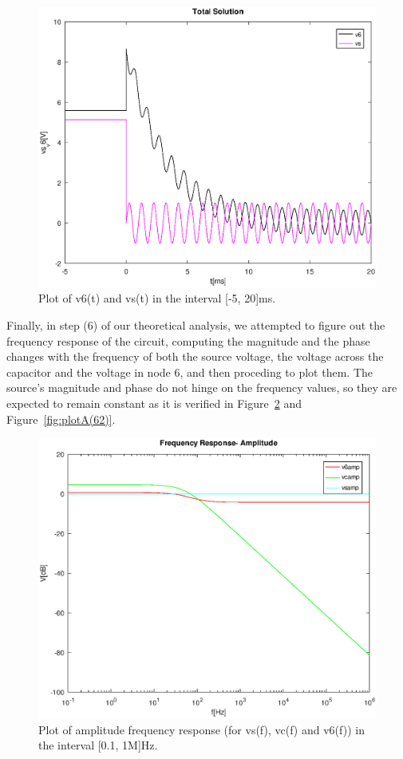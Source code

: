 \begin{figure}[h] \centering
\includegraphics[width=0.8\linewidth]{TotalSolution.eps}
\caption{Plot of v6(t) and vs(t) in the interval [-5, 20]ms.}
\label{fig:plotA(5)}
\end{figure}

Finally, in step (6) of our theoretical analysis, we attempted to figure out the frequency response of the circuit, computing the magnitude and the phase changes with the frequency of both the source voltage, the voltage across the capacitor and the voltage in node 6, and then proceding to plot them.
The source's magnitude and phase do not hinge on the frequency values, so they are expected to remain constant as it is verified in Figure~\ref{fig:plotA(61)} and Figure~\ref{fig:plotA(62)}.

\vspace{5.0cm}

\begin{figure}[h] \centering
\includegraphics[width=0.6\linewidth]{FrequencyResponseAmplitude.eps}
\caption{Plot of amplitude frequency response (for vs(f), vc(f) and v6(f)) in the interval [0.1, 1M]Hz.}
\label{fig:plotA(61)}
\end{figure}

